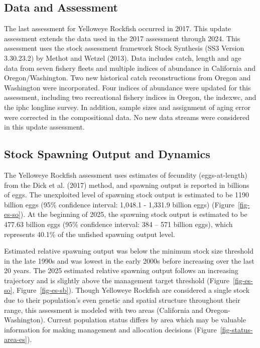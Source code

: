 \documentclass[
]{scrartcl}
\begin{document}
\clearpage

\subsection*{Data and Assessment}\label{data-and-assessment}

The last assessment for Yelloweye Rockfish occurred in 2017. This update
assessment extends the data used in the 2017 assessment through 2024.
This assessment uses the stock assessment framework Stock Synthesis (SS3
Version 3.30.23.2) by Methot and Wetzel (2013). Data includes catch,
length and age data from seven fishery fleets and multiple indices of
abundance in California and Oregon/Washington. Two new historical catch
reconstructions from Oregon and Washington were incorporated. Four
indices of abundance were updated for this assessment, including two
recreational fishery indices in Oregon, the \gls{indexwc}, and the
\gls{iphc} longline survey. In addition, sample sizes and assignment of
aging error were corrected in the compositional data. No new data
streams were considered in this update assessment.

\subsection*{Stock Spawning Output and
Dynamics}\label{stock-spawning-output-and-dynamics}

The Yelloweye Rockfish assessment uses estimates of fecundity
(eggs-at-length) from the Dick et al. (2017) method, and spawning output
is reported in billions of eggs. The unexploited level of spawning stock
output is estimated to be 1190 billion eggs (95\% confidence interval:
1,048.1 - 1,331.9 billion eggs) (Figure~\ref{fig-es-so}). At the
beginning of 2025, the spawning stock output is estimated to be 477.63
billion eggs (95\% confidence interval: 384 -- 571 billion eggs), which
represents 40.1\% of the unfished spawning output level.

Estimated relative spawning output was below the minimum stock size
threshold in the late 1990s and was lowest in the early 2000s before
increasing over the last 20 years. The 2025 estimated relative spawning
output follows an increasing trajectory and is slightly above the
management target threshold (Figure~\ref{fig-es-so},
Figure~\ref{fig-es-sb}). Though Yelloweye Rockfish are considered a
single stock due to their population's even genetic and spatial
structure throughout their range, this assessment is modeled with two
areas (California and Oregon-Washington). Current population status
differs by area which may be valuable information for making management
and allocation decisions (Figure~\ref{fig-status-area-es}).
\end{document}
